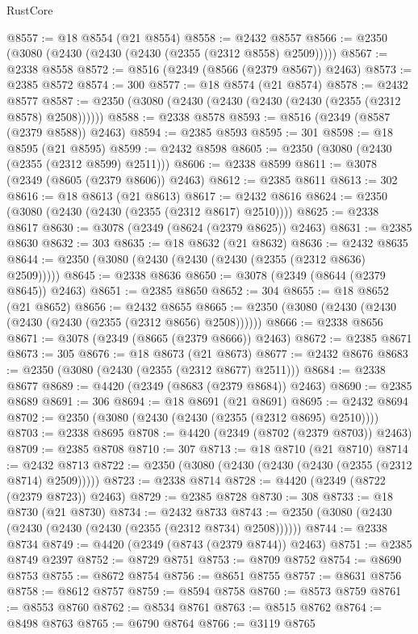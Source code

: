 \begin{lexlean}{RustCore}
\begin{coremodule}
@8557 := @18 @8554 (@21 @8554)
@8558 := @2432 @8557
@8566 := @2350 (@3080 (@2430 (@2430 (@2430 (@2355 (@2312 @8558) @2509)))))
@8567 := @2338 @8558
@8572 := @8516 (@2349 (@8566 (@2379 @8567)) @2463)
@8573 := @2385 @8572
@8574 := 300
@8577 := @18 @8574 (@21 @8574)
@8578 := @2432 @8577
@8587 := @2350 (@3080 (@2430 (@2430 (@2430 (@2430 (@2355 (@2312 @8578) @2508))))))
@8588 := @2338 @8578
@8593 := @8516 (@2349 (@8587 (@2379 @8588)) @2463)
@8594 := @2385 @8593
@8595 := 301
@8598 := @18 @8595 (@21 @8595)
@8599 := @2432 @8598
@8605 := @2350 (@3080 (@2430 (@2355 (@2312 @8599) @2511)))
@8606 := @2338 @8599
@8611 := @3078 (@2349 (@8605 (@2379 @8606)) @2463)
@8612 := @2385 @8611
@8613 := 302
@8616 := @18 @8613 (@21 @8613)
@8617 := @2432 @8616
@8624 := @2350 (@3080 (@2430 (@2430 (@2355 (@2312 @8617) @2510))))
@8625 := @2338 @8617
@8630 := @3078 (@2349 (@8624 (@2379 @8625)) @2463)
@8631 := @2385 @8630
@8632 := 303
@8635 := @18 @8632 (@21 @8632)
@8636 := @2432 @8635
@8644 := @2350 (@3080 (@2430 (@2430 (@2430 (@2355 (@2312 @8636) @2509)))))
@8645 := @2338 @8636
@8650 := @3078 (@2349 (@8644 (@2379 @8645)) @2463)
@8651 := @2385 @8650
@8652 := 304
@8655 := @18 @8652 (@21 @8652)
@8656 := @2432 @8655
@8665 := @2350 (@3080 (@2430 (@2430 (@2430 (@2430 (@2355 (@2312 @8656) @2508))))))
@8666 := @2338 @8656
@8671 := @3078 (@2349 (@8665 (@2379 @8666)) @2463)
@8672 := @2385 @8671
@8673 := 305
@8676 := @18 @8673 (@21 @8673)
@8677 := @2432 @8676
@8683 := @2350 (@3080 (@2430 (@2355 (@2312 @8677) @2511)))
@8684 := @2338 @8677
@8689 := @4420 (@2349 (@8683 (@2379 @8684)) @2463)
@8690 := @2385 @8689
@8691 := 306
@8694 := @18 @8691 (@21 @8691)
@8695 := @2432 @8694
@8702 := @2350 (@3080 (@2430 (@2430 (@2355 (@2312 @8695) @2510))))
@8703 := @2338 @8695
@8708 := @4420 (@2349 (@8702 (@2379 @8703)) @2463)
@8709 := @2385 @8708
@8710 := 307
@8713 := @18 @8710 (@21 @8710)
@8714 := @2432 @8713
@8722 := @2350 (@3080 (@2430 (@2430 (@2430 (@2355 (@2312 @8714) @2509)))))
@8723 := @2338 @8714
@8728 := @4420 (@2349 (@8722 (@2379 @8723)) @2463)
@8729 := @2385 @8728
@8730 := 308
@8733 := @18 @8730 (@21 @8730)
@8734 := @2432 @8733
@8743 := @2350 (@3080 (@2430 (@2430 (@2430 (@2430 (@2355 (@2312 @8734) @2508))))))
@8744 := @2338 @8734
@8749 := @4420 (@2349 (@8743 (@2379 @8744)) @2463)
@8751 := @2385 @8749 @2397
@8752 := @8729 @8751
@8753 := @8709 @8752
@8754 := @8690 @8753
@8755 := @8672 @8754
@8756 := @8651 @8755
@8757 := @8631 @8756
@8758 := @8612 @8757
@8759 := @8594 @8758
@8760 := @8573 @8759
@8761 := @8553 @8760
@8762 := @8534 @8761
@8763 := @8515 @8762
@8764 := @8498 @8763
@8765 := @6790 @8764
@8766 := @3119 @8765

\end{coremodule}
\end{lexlean}
